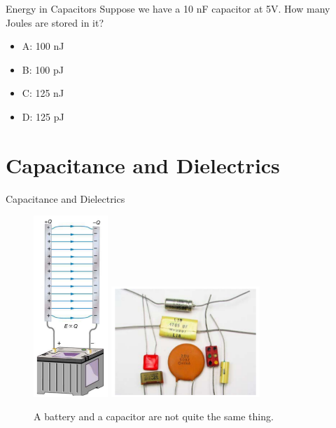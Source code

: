 \documentclass{beamer}
\begin{document}
\begin{frame}{Energy in Capacitors}
Suppose we have a 10 nF capacitor at 5V.  How many Joules are stored in it?
\begin{itemize}
\item A: 100 nJ
\item B: 100 pJ
\item C: 125 nJ
\item D: 125 pJ
\end{itemize}
\end{frame}


\section{Capacitance and Dielectrics}

\begin{frame}{Capacitance and Dielectrics}
\begin{figure}
\centering
\includegraphics[width=0.25\textwidth]{figures/batt2.png}
\includegraphics[width=0.5\textwidth]{figures/batt3.png}
\caption{\label{fig:batt2} A battery and a capacitor are not quite the same thing.}
\end{figure}
\end{frame}
\end{document}
